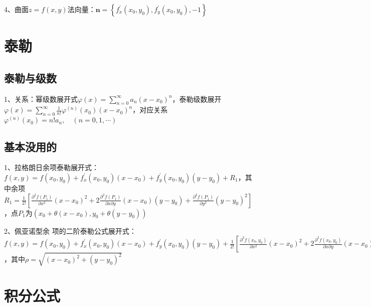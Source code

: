 4、曲面$z=f(x, y)$法向量：$\boldsymbol{n}=\left\{f_{x}^{\prime}\left(x_{0}, y_{0}\right),f_{y}^{\prime}\left(x_{0}, y_{0}\right),-1\right\}$

\section{泰勒}



\subsection{泰勒与级数}

1、关系：幂级数展开式$\varphi(x)=\sum_{n=0}^{\infty} a_{n}\left(x-x_{0}\right)^{n}$，泰勒级数展开$\varphi(x)=\sum_{n=0}^{\infty} \frac{1}{n !} \varphi^{(n)}\left(x_{0}\right)\left(x-x_{0}\right)^{n}$，对应关系$\varphi^{(n)}\left(x_{0}\right)=n ! a_{n}, \quad(n=0,1, \cdots)$



\subsection{基本没用的}

1、拉格朗日余项泰勒展开式：$f(x, y)=f\left(x_{0}, y_{0}\right)+f_{x}^{\prime}\left(x_{0}, y_{0}\right)\left(x-x_{0}\right)+f_{y}^{\prime}\left(x_{0}, y_{0}\right)\left(y-y_{0}\right)+R_{1}$，其中余项$R_{1}=\frac{1}{2 !}\left[\frac{\partial^{2} f\left(P_{1}\right)}{\partial x^{2}}\left(x-x_{0}\right)^{2}+2 \frac{\partial^{2} f\left(P_{1}\right)}{\partial x \partial y}\left(x-x_{0}\right)\left(y-y_{0}\right)+\frac{\partial^{2} f\left(P_{1}\right)}{\partial y^{2}}\left(y-y_{0}\right)^{2}\right]$，点$P_{1}$为$\left(x_{0}+\theta\left(x-x_{0}\right), y_{0}+\theta\left(y-y_{0}\right)\right)$

2、佩亚诺型余 项的二阶泰勒公式展开式：$f(x, y)=f\left(x_{0}, y_{0}\right)+f_{x}^{\prime}\left(x_{0}, y_{0}\right)\left(x-x_{0}\right)+f_{y}^{\prime}\left(x_{0}, y_{0}\right)\left(y-y_{0}\right)+\frac{1}{2 !}[\frac{\partial^{2} f\left(x_{0}, y_{0}\right)}{\partial x^{2}}\left(x-x_{0}\right)^{2}+2 \frac{\partial^{2} f\left(x_{0}, y_{0}\right)}{\partial x \partial y}\left(x-x_{0}\right)\left(y-y_{0}\right)+\frac{\partial^{2} f\left(x_{0}, y_{0}\right)}{\partial y^{2}}\left(y-y_{0}\right)^{2}]+o\left(\rho^{2}\right)$，其中$\rho=\sqrt{\left(x-x_{0}\right)^{2}+\left(y-y_{0}\right)^{2}}$

\section{积分公式}



